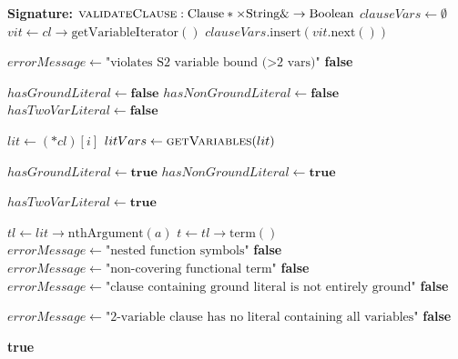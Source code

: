 \begin{algorithm}[htpb]
\caption{S2 Clause Validation}
\label{alg:fo2_validate_clause}
\begin{algorithmic}[1]
    \Statex \textbf{Signature:} $\textsc{validateClause}: \text{Clause}* \times \text{String}\& \to \text{Boolean}$
        \State $clauseVars \leftarrow \emptyset$
        \State $vit \leftarrow cl\to\text{getVariableIterator}()$
            \State $clauseVars.\text{insert}(vit.\text{next}())$
        \EndWhile
    
            \State $errorMessage \leftarrow \text{"violates S2 variable bound (>2 vars)"}$
            \State \Return \textbf{false}
        \EndIf

        \State $hasGroundLiteral \leftarrow \textbf{false}$
        \State $hasNonGroundLiteral \leftarrow \textbf{false}$
        \State $hasTwoVarLiteral \leftarrow \textbf{false}$

            \State $lit \leftarrow (*cl)[i]$
            \State $litVars \leftarrow \textsc{getVariables}(lit)$
            
                \State $hasGroundLiteral \leftarrow \textbf{true}$
                \State $hasNonGroundLiteral \leftarrow \textbf{true}$
            \EndIf

                \State $hasTwoVarLiteral \leftarrow \textbf{true}$
            \EndIf

                \State $tl \leftarrow lit\to\text{nthArgument}(a)$
                    \State $t \leftarrow tl\to\text{term}()$
                        \State $errorMessage \leftarrow \text{"nested function symbols"}$
                        \State \Return \textbf{false}
                    \EndIf
                        \State $errorMessage \leftarrow \text{"non-covering functional term"}$
                        \State \Return \textbf{false}
                    \EndIf
                \EndIf
            \EndFor
        \EndFor
            \State $errorMessage \leftarrow \text{"clause containing ground literal is not entirely ground"}$
            \State \Return \textbf{false}
        \EndIf

            \State $errorMessage \leftarrow \text{"2-variable clause has no literal containing all variables"}$
            \State \Return \textbf{false}
        \EndIf

        \State \Return \textbf{true}
    \EndFunction
\end{algorithmic}
\end{algorithm}

